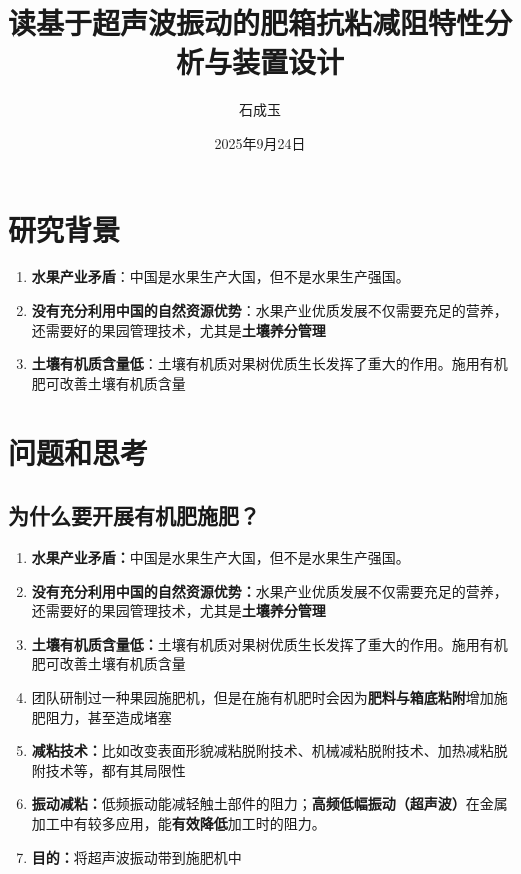 \documentclass[zihao=5,UTF8,fontset=windows]{ctexart}
\author{石成玉}
\title{读基于超声波振动的肥箱抗粘减阻特性分析与装置设计}
\date{2025年9月24日}
\begin{document}
\maketitle

\tableofcontents

\section{研究背景}

\begin{enumerate}
	\item \textbf{水果产业矛盾}：中国是水果生产大国，但不是水果生产强国。
	\item \textbf{没有充分利用中国的自然资源优势}：水果产业优质发展不仅需要充足的营养，还需要好的果园管理技术，尤其是\textbf{土壤养分管理}
	\item \textbf{土壤有机质含量低}：土壤有机质对果树优质生长发挥了重大的作用。施用有机肥可改善土壤有机质含量
\end{enumerate}

\section{问题和思考}

\subsection{为什么要开展有机肥施肥？}

\begin{enumerate}
	\item \textbf{水果产业矛盾：}中国是水果生产大国，但不是水果生产强国。
	\item \textbf{没有充分利用中国的自然资源优势：}水果产业优质发展不仅需要充足的营养，还需要好的果园管理技术，尤其是\textbf{土壤养分管理}
	\item \textbf{土壤有机质含量低：}土壤有机质对果树优质生长发挥了重大的作用。施用有机肥可改善土壤有机质含量
	\item 团队研制过一种果园施肥机，但是在施有机肥时会因为\textbf{肥料与箱底粘附}增加施肥阻力，甚至造成堵塞
	\item \textbf{减粘技术：}比如改变表面形貌减粘脱附技术、机械减粘脱附技术、加热减粘脱附技术等，都有其局限性
	\item \textbf{振动减粘：}低频振动能减轻触土部件的阻力；\textbf{高频低幅振动（超声波）}在金属加工中有较多应用，能\textbf{有效降低}加工时的阻力。
	\item \textbf{目的：}将超声波振动带到施肥机中
\end{enumerate}
\end{document}
